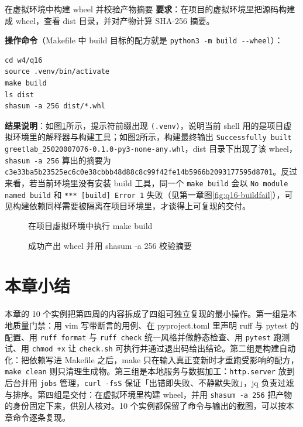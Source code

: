 \begin{exercise}{在虚拟环境中构建 wheel 并校验产物摘要}
\textbf{要求}：在项目的虚拟环境里把源码构建成 wheel，查看 dist 目录，并对产物计算 SHA-256 摘要。

\textbf{操作命令}（Makefile 中 build 目标的配方就是 \verb|python3 -m build --wheel|）：
\begin{lstlisting}
cd w4/q16
source .venv/bin/activate
make build
ls dist
shasum -a 256 dist/*.whl
\end{lstlisting}

\textbf{结果说明}：如图\ref{fig:ms4-10a}所示，提示符前缀出现 \texttt{(.venv)}，说明当前 shell 用的是项目虚拟环境里的解释器与构建工具；如图\ref{fig:ms4-10b}所示，构建最终输出 \texttt{Successfully built greetlab\_25020007076-0.1.0-py3-none-any.whl}，dist 目录下出现了该 wheel，\verb|shasum -a 256| 算出的摘要为 \texttt{c3e33ba5b23525ec6c0e38\allowbreak cbbb48d88c8c99f42fe14\allowbreak b5966b2093177595d8701}。反过来看，若当前环境里没有安装 build 工具，同一个 \verb|make build| 会以 \texttt{No module named build} 和 \texttt{*** [build] Error 1} 失败（见第一章图\ref{fig:q16-buildfail}），可见构建依赖同样需要被隔离在项目环境里，才谈得上可复现的交付。

\begin{figure}[H]
    \centering
    \caption{在项目虚拟环境中执行 make build}
    \label{fig:ms4-10a}
\end{figure}

\begin{figure}[H]
    \centering
    \caption{成功产出 wheel 并用 shasum -a 256 校验摘要}
    \label{fig:ms4-10b}
\end{figure}
\end{exercise}

\section{本章小结}

本章的 10 个实例把第四周的内容拆成了四组可独立复现的最小操作。第一组是本地质量门禁：用 vim 写带断言的用例、在 pyproject.toml 里声明 ruff 与 pytest 的配置、用 \verb|ruff format| 与 \verb|ruff check| 统一风格并做静态检查、用 \verb|pytest| 跑测试、用 \verb|chmod +x| 让 \verb|check.sh| 可执行并通过退出码给出结论。第二组是构建自动化：把依赖写进 Makefile 之后，make 只在输入真正变新时才重跑受影响的配方，\verb|make clean| 则只清理生成物。第三组是本地服务与数据加工：\verb|http.server| 放到后台并用 \verb|jobs| 管理，\verb|curl -fsS| 保证「出错即失败、不静默失败」，jq 负责过滤与排序。第四组是交付：在虚拟环境里构建 wheel，并用 \verb|shasum -a 256| 把产物的身份固定下来，供别人核对。10 个实例都保留了命令与输出的截图，可以按本章命令逐条复现。
